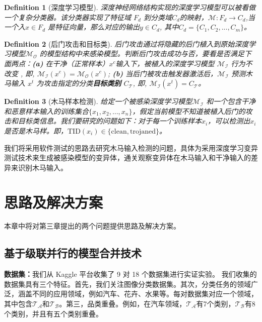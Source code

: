 \documentclass[fontset=macnew,UTF8]{article} %
\newtheorem{definition}{Definition}
\begin{document}
\begin{definition}[深度学习模型]
深度神经网络结构实现的深度学习模型可以被看做一个复杂分类器。该分类器实现了特征域 $F_d$ 到分类域$C_d$的映射，$\mathcal{M}: F_d\rightarrow C_d$,当一个入$x\in F_d$ 是特征向量，那么对应的输出$y\in C_d$, 其中$C_d=\{C_1,C_2,...,C_m\}$。
\end{definition}

\begin{definition}[后门攻击和目标类]
后门攻击通过将隐藏的后门植入到原始深度学习模型$\mathcal{M}_\mathcal{O}$ 的模型结构中来感染模型。判断后门攻击成功与否，要看是否满足下面两点：\textbf{(a)}
在干净（正常样本）$x^c$输入下，被植入的深度学习模型 $\mathcal{M}_\mathcal{I}$ 行为不改变 , 即, $\mathcal{M}_\mathcal{I}(x^c)=\mathcal{M}_\mathcal{O}(x^c)$; 
\textbf{(b)} 
当后门被攻击触发器激活后，$\mathcal{M}_\mathcal{I}$ 预测木马输入 $x^t$ 为攻击指定的分类\textbf{目标类别} $C_\mathcal{T}$, 即,  $\mathcal{M}_\mathcal{I}(x^t)=C_\mathcal{T}$。
\end{definition}

\begin{definition}[木马样本检测]
给定一个被感染深度学习模型$\mathcal{M}_\mathcal{I}$ 和一个包含干净和恶意样本输入的训练集合$\{x_1,x_2,\dots,x_n\}$，假定当前模型不知道被植入后门的攻击和目标类信息。我们要研究的问题如下：对于每一个训练样本${x_i}$，可以检测出$x_i$是否是木马样。即，$\text{TID}(x_i)\in \{\text{clean},\text{trojaned}\}$。
\end{definition}

我们将采用软件测试的思路去研究木马输入检测的问题，具体为采用深度学习变异测试技术来生成被感染模型的变异体，通关观察变异体在木马输入和干净输入的差异来识别木马输入。


\section{思路及解决方案}
本章中将对第三章提出的两个问题提供思路及解决方案。

\subsection{基于级联并行的模型合并技术}
\textbf{数据集：}我们从 Kaggle 平台收集了 9 对 18 个数据集进行实证实验。 我们收集的数据集具有三个特征。首先，我们关注图像分类数据集。其次，分类任务的领域广泛，涵盖不同的应用领域，例如汽车、花卉、水果等。每对数据集对应一个领域，其中包含$\mathcal{T_A}$和$\mathcal{T_B}$。第三，品类重叠。例如，在汽车领域，$\mathcal{T_A}$有7个类别，$\mathcal{T_B}$有8个类别，并且有五个类别重叠。
\end{document}
